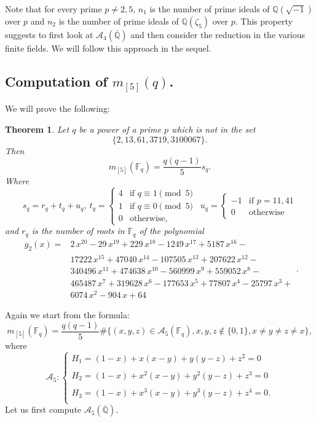 \documentclass[a4paper,twoside]{article}
\newtheorem{Theorem}{Theorem}[section]
\begin{document}
Note that for every prime $p\neq 2,5$, $n_1$ is the number of prime ideals of $\mathbb Q(\sqrt{-1})$ over $p$ and
$n_2$ is the number of prime ideals of $\mathbb Q(\zeta_5)$ over $p$. This property suggests to first look
at $\mathcal A_4(\overline{\mathbb Q})$ and then consider the reduction in the various finite fields. We will follow this approach in the sequel.

\subsection{Computation of $m_{[5]}(q)$.}

We will prove the following:

\begin{Theorem} Let $q$ be a power of a prime $p$ which is not
in the set
$$\{2, 13, 61, 3719, 3100067\}.
$$
Then
$$m_{[5]}(\mathbb F_q)=\frac{q(q-1)}{5}s_q.$$
Where
$$s_q=r_q+t_q+u_q,\ t_q=\left\{
\begin{array}{rl}
4 & \text{if $q\equiv1\pmod 5$}\\
1& \text{if $q\equiv0\pmod 5$}\\
0 & \text{otherwise,}\end{array}
\right.
\ \ u_q=\left\{
\begin{array}{rl}
-1 & \text{if $p=11,41$}\\
0 & \text{otherwise}\end{array}
\right.
$$
and $r_q$ is the number of roots in $\mathbb F_q$ of the
polynomial
$$\begin{array}{rl}
g_2(x)=&
2\,{x}^{20}-29\,{x}^{19}+229\,{x}^{18}-1249\,{x}^{17}+5187\,{x}^{16}-\\
&17222\,{x}^{15}+47040\,{x}^{14}-107505\,{x}^{13}+207622\,{x}^{12}-\\
&340496\,{x}^{11}+474638\,{x}^{10}-560999\,{x}^{9}+559052\,{x}^{8}-\\
&465487\,{x}^{7}+319628\,{x}^{6}-177653\,{x}^{5}+77807\,{x}^{4}-25797\,{x}^{3}+\\
&6074\,{x}^{2}-904\,x+64
\end{array}.$$
\end{Theorem}

 Again we start from the formula:
$$m_{[5]}(\mathbb F_q)=\frac{q(q-1)}{5}\#\{(x,y,z)\in
\mathcal A_5(\mathbb F_q), x,y,z\not\in\{0,1\}, x\neq y\neq z\neq
x\},$$ where
$$\mathcal A_5:\left\{
\begin{array}{r}
H_1=(1-x)+x(x-y)+y(y-z)+z^2=0\\
\\
H_2=(1-x)+x^2(x-y)+y^2(y-z)+z^3=0\\
\\
H_3=(1-x)+x^3(x-y)+y^3(y-z)+z^4=0.\\
\end{array}
\right.$$ Let us first compute $\mathcal A_5(\overline{\mathbb
Q})$.
\end{document}
